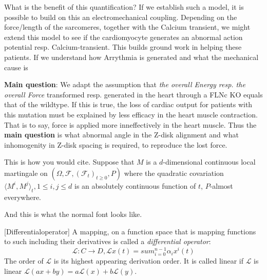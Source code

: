 What is the benefit of this quantification? If we establish such a model, it is possible to build on this an electromechanical coupling. Depending on the force/length of the sarcomeres, together with the Calcium transient, we might extend this model to see if the cardiomyocyte generates an abnormal action potential resp. Calcium-transient. This builds ground work in helping these patients. If we understand how Arrythmia is generated and what the mechanical cause is




\textbf{Main question}: We adapt the assumption that \textit{the overall Energy resp. the overall Force} transformed resp. generated in the heart through a FLNc KO equals that of the wildtype. \newline 
If this is true, the loss of cardiac output for patients with this mutation must be explained by less efficacy in the heart muscle contraction. That is to say, force is applied more inneffectively in the heart muscle. Thus the \textbf{main question} is what abnormal angle in the Z-disk alignment and what inhomogenity in Z-disk spacing is required, to reproduce the lost force.



\begin{theorem}\cite[thm. 4.2, p.170]{Karatzas}
This is how you would cite. Suppose that $M$ is a $d$-dimensional continuous local martingale on $(\Omega, \mathcal{F}, (\mathcal{F}_t)_{t \geq 0}, P)$ where the quadratic covariation $\langle M^i, M^j \rangle_t, 1 \leq i,j \leq d$ is an absolutely continuous function of $t$, $P$-almost everywhere.
\end{theorem}
And this is what the normal font looks like.

\begin{definition}\cite[p. 135]{EckGarcke2017} [Differentialoperator] A mapping, on a function space that is mapping functions to such including their derivatives is called a \textit{differential operator}:
\begin{equation*}
	\mathcal{L}: C \rightarrow D, \mathcal{L}x(t) = sum_{i=0}^{n-1} \alpha_i x^i (t)
\end{equation*}
The order of $\mathcal{L}$ is its highest appearing derivation order. It is called linear if $\mathcal{L}$ is linear $\mathcal{L}(ax + by) = a \mathcal{L}(x) + b \mathcal{L}(y)$.
\end{definition}


